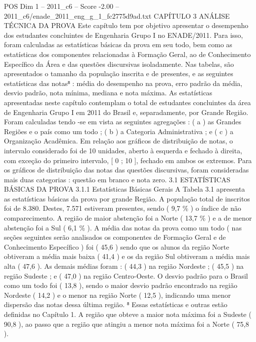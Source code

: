 \begin{textsample}{POS Dim 1 – 2011\_c6 – Score -2.00 – 2011\_c6/enade\_2011\_eng\_g\_1\_fc2775d9ad.txt}  \label{ex:f1_pos_217}
CAPÍTULO 3 ANÁLISE TÉCNICA DA PROVA Este capítulo tem por objetivo apresentar o desempenho dos estudantes concluintes de Engenharia Grupo I no ENADE/2011.
Para isso, foram calculadas as estatísticas básicas da prova em seu todo, bem como as estatísticas dos componentes relacionadas à Formação Geral, ao de Conhecimento Específico da Área e das questões discursivas isoladamente.
Nas tabelas, são apresentados o tamanho da população inscrita e de presentes, e as seguintes estatísticas das notas⁸ : média do desempenho na prova, erro padrão da média, desvio padrão, nota mínima, mediana e nota máxima.
As estatísticas apresentadas neste capítulo contemplam o total de estudantes concluintes da área de Engenharia Grupo I em 2011 do Brasil e, separadamente, por Grande Região.
Foram calculadas tendo -se em vista as seguintes agregações : ( a ) as Grandes Regiões e o país como um todo ; ( b ) a Categoria Administrativa ; e ( c ) a Organização Acadêmica.
Em relação aos gráficos de distribuição de notas, o intervalo considerado foi de 10 unidades, aberto à esquerda e fechado à direita, com exceção do primeiro intervalo, [ 0 ; 10 ], fechado em ambos os extremos.
Para os gráficos de distribuição das notas das questões discursivas, foram consideradas mais duas categorias : questão em branco e nota zero. 3.1 ESTATÍSTICAS BÁSICAS DA PROVA 3.1.1 Estatísticas Básicas Gerais A Tabela 3.1 apresenta as estatísticas básicas da prova por grande Região.
A população total de inscritos foi de 8.380.
Destes, 7.571 estiveram presentes, sendo ( 9,7 \% ) o índice de não comparecimento.
A região de maior abstenção foi a Norte ( 13,7 \% ) e a de menor abstenção foi a Sul ( 6,1 \% ).
A média das notas da prova como um todo ( nas seções seguintes serão analisados os componentes de Formação Geral e de Conhecimento Específico ) foi ( 45,6 ) sendo que os alunos da região Norte obtiveram a média mais baixa ( 41,4 ) e os da região Sul obtiveram a média mais alta ( 47,6 ).
As demais médias foram : ( 44,3 ) na região Nordeste ; ( 45,5 ) na região Sudeste ; e ( 47,0 ) na região Centro-Oeste.
O desvio padrão para o Brasil como um todo foi ( 13,8 ), sendo o maior desvio padrão encontrado na região Nordeste ( 14,2 ) e o menor na região Norte ( 12,5 ), indicando uma menor dispersão das notas dessa última região. ⁸ Essas estatísticas e outras estão definidas no Capítulo 1.
A região que obteve a maior nota máxima foi a Sudeste ( 90,8 ), ao passo que a região que atingiu a menor nota máxima foi a Norte ( 75,8 ).

\end{textsample}
